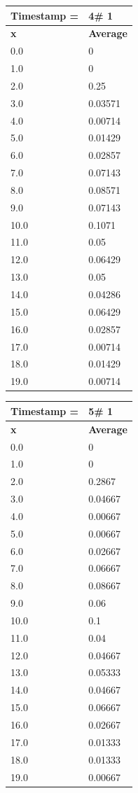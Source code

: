 \begin{tabular}{|l||l|}
\hline
\textbf{Timestamp =} & \textbf{4}\# 1\\\hline
	\textbf{x} & \textbf{Average} \\ \hline
\hline
	0.0 & 0 \\ \hline
	1.0 & 0 \\ \hline
	2.0 & 0.25 \\ \hline
	3.0 & 0.03571 \\ \hline
	4.0 & 0.00714 \\ \hline
	5.0 & 0.01429 \\ \hline
	6.0 & 0.02857 \\ \hline
	7.0 & 0.07143 \\ \hline
	8.0 & 0.08571 \\ \hline
	9.0 & 0.07143 \\ \hline
	10.0 & 0.1071 \\ \hline
	11.0 & 0.05 \\ \hline
	12.0 & 0.06429 \\ \hline
	13.0 & 0.05 \\ \hline
	14.0 & 0.04286 \\ \hline
	15.0 & 0.06429 \\ \hline
	16.0 & 0.02857 \\ \hline
	17.0 & 0.00714 \\ \hline
	18.0 & 0.01429 \\ \hline
	19.0 & 0.00714 \\ \hline
\end{tabular}
\begin{tabular}{|l||l|}
\hline
\textbf{Timestamp =} & \textbf{5}\# 1\\\hline
	\textbf{x} & \textbf{Average} \\ \hline
\hline
	0.0 & 0 \\ \hline
	1.0 & 0 \\ \hline
	2.0 & 0.2867 \\ \hline
	3.0 & 0.04667 \\ \hline
	4.0 & 0.00667 \\ \hline
	5.0 & 0.00667 \\ \hline
	6.0 & 0.02667 \\ \hline
	7.0 & 0.06667 \\ \hline
	8.0 & 0.08667 \\ \hline
	9.0 & 0.06 \\ \hline
	10.0 & 0.1 \\ \hline
	11.0 & 0.04 \\ \hline
	12.0 & 0.04667 \\ \hline
	13.0 & 0.05333 \\ \hline
	14.0 & 0.04667 \\ \hline
	15.0 & 0.06667 \\ \hline
	16.0 & 0.02667 \\ \hline
	17.0 & 0.01333 \\ \hline
	18.0 & 0.01333 \\ \hline
	19.0 & 0.00667 \\ \hline
\end{tabular}

